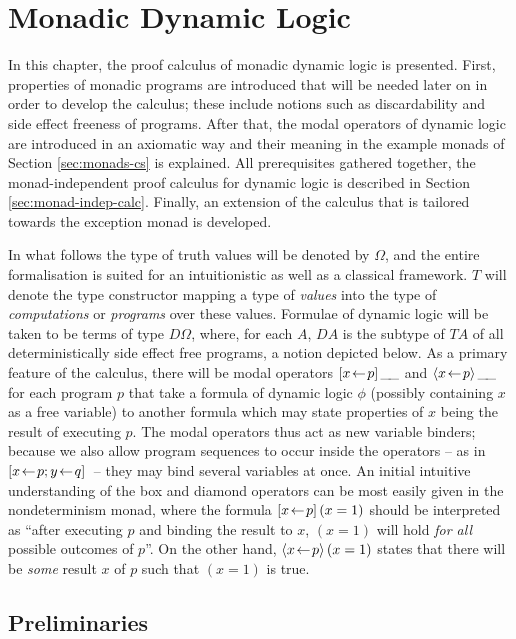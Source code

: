 
\chapter{Monadic Dynamic Logic}
\label{cha:logic}

In this chapter, the proof calculus of monadic dynamic logic is presented.
First, properties of monadic programs are introduced that will be needed later
on in order to develop the calculus; these include notions such as
discardability and side effect freeness of programs. After that, the modal
operators of dynamic logic are introduced in an axiomatic way and their meaning
in the example monads of Section \ref{sec:monads-cs} is explained. All
prerequisites gathered together, the monad-independent proof calculus for
dynamic logic is described in Section \ref{sec:monad-indep-calc}. Finally, an
extension of the calculus that is tailored towards the exception monad is
developed.

In what follows the type of truth values will be denoted by $\Omega$, and the entire
formalisation is suited for an intuitionistic as well as a classical framework.
$T$ will denote the type constructor mapping a type of \emph{values} into the
type of \emph{computations} or \emph{programs} over these values.
Formulae of dynamic logic will be taken to be terms of type $D\Omega$, where, for each
$A$, $D A$ is the subtype of $T A$ of all deterministically side effect free
programs, a notion depicted below. As a primary feature of the calculus, there
will be modal operators $[x \!\gets\! p]\,{\_\!\_}$ and $\langle x \!\gets\!
  p\rangle\,{\_\!\_}$ for each program $p$ that take a formula of dynamic logic $\phi$
(possibly containing $x$ as a free variable) to another formula which may state
properties of $x$ being the result of executing $p$. The modal operators thus
act as new variable binders; because we also allow program sequences to occur
inside the operators -- as in $[x\!\gets\! p; y\!\gets\! q]\,$ -- they may bind
several variables at once. An initial intuitive understanding of the box and
diamond operators can be most easily given in the nondeterminism monad, where
the formula $[x\!\gets\! p]\,{(x=1)}$ should be interpreted as ``after
executing $p$ and binding the result to $x$, $(x=1)$ will hold \emph{for all}
possible outcomes of $p$''. On the other hand, $\langle x\!\gets\! p\rangle\,{(x=1)}$
states that there will be \emph{some} result $x$ of $p$ such that $(x=1)$ is
true.


\section{Preliminaries}
\label{sec:dl-prelim}

